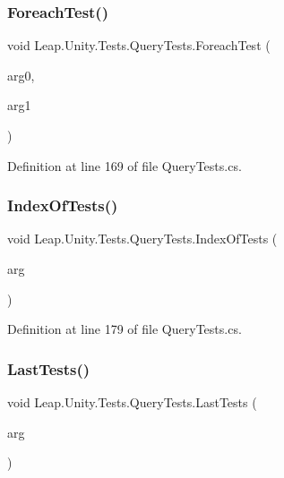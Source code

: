 \subsubsection{\texorpdfstring{ForeachTest()}{ForeachTest()}}
{\footnotesize\ttfamily void Leap.\+Unity.\+Tests.\+Query\+Tests.\+Foreach\+Test (\begin{DoxyParamCaption}\item[{\mbox{[}\+Value\+Source(\char`\"{}list0\char`\"{})\mbox{]} \mbox{\hyperlink{class_leap_1_1_unity_1_1_tests_1_1_query_tests_1_1_query_arg}{Query\+Arg}}}]{arg0,  }\item[{\mbox{[}\+Value\+Source(\char`\"{}list1\char`\"{})\mbox{]} \mbox{\hyperlink{class_leap_1_1_unity_1_1_tests_1_1_query_tests_1_1_query_arg}{Query\+Arg}}}]{arg1 }\end{DoxyParamCaption})}



Definition at line 169 of file Query\+Tests.\+cs.

\mbox{\label{class_leap_1_1_unity_1_1_tests_1_1_query_tests_a74bff637aa940161e7781b930cc12e54}} 
\subsubsection{\texorpdfstring{IndexOfTests()}{IndexOfTests()}}
{\footnotesize\ttfamily void Leap.\+Unity.\+Tests.\+Query\+Tests.\+Index\+Of\+Tests (\begin{DoxyParamCaption}\item[{\mbox{[}\+Value\+Source(\char`\"{}list0\char`\"{})\mbox{]} \mbox{\hyperlink{class_leap_1_1_unity_1_1_tests_1_1_query_tests_1_1_query_arg}{Query\+Arg}}}]{arg }\end{DoxyParamCaption})}



Definition at line 179 of file Query\+Tests.\+cs.

\mbox{\label{class_leap_1_1_unity_1_1_tests_1_1_query_tests_aa4a662a8acf5c66e247b4f02b3430739}} 
\subsubsection{\texorpdfstring{LastTests()}{LastTests()}}
{\footnotesize\ttfamily void Leap.\+Unity.\+Tests.\+Query\+Tests.\+Last\+Tests (\begin{DoxyParamCaption}\item[{\mbox{[}\+Value\+Source(\char`\"{}list0\char`\"{})\mbox{]} \mbox{\hyperlink{class_leap_1_1_unity_1_1_tests_1_1_query_tests_1_1_query_arg}{Query\+Arg}}}]{arg }\end{DoxyParamCaption})}



